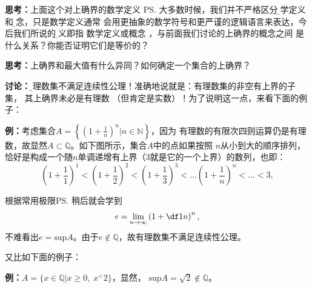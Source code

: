 	{\bf 思考：}上面这个对上确界的数学定义
	\ps{大多数时候，我们并不严格区分{\b 数学定义}和{\b 概念}，只是数学定义通常
	会用更抽象的数学符号和更严谨的逻辑语言来表达，今后我们所说的{\b 定义}即指
	数学定义或概念}
	，与前面我们讨论的上确界的概念之间	是什么关系？你能否证明它们是等价的？
	
	{\bf 思考：}上确界和最大值有什么异同？如何确定一个集合的上确界？
	
	{\bf 讨论：}{\b 有理数集不满足连续性公理！}准确地说就是：有理数集的非空有上界的子集，
	其上确界未必是有理数	（但肯定是实数）！为了说明这一点，来看下面的例子：
	
	{\bf 例：}考虑集合$A=\left\{\left(1+\frac 1n\right)^n|n\in\mathbb{N}\right\}$，因为
	有理数的有限次四则运算仍是有理数，故显然$A\subset\mathbb{Q}$。如下图所示，集合$A$中的点如果按照
	$n$从小到大的顺序排列，恰好是构成一个随$n$单调递增有上界（$3$就是它的一个上界）的数列，也即：
	$$\left(1+\frac11\right)^1<\left(1+\frac12\right)^2<\left(1+\frac13\right)^3<\ldots
	\left(1+\frac1n\right)^n<\ldots<3,$$
	\begin{center}
	\end{center}
	根据常用极限\ps{稍后就会学到}
	$$e=\lim\limits_{n\to\infty}\left(1+\df1n\right)^n,$$
	不难看出$e=\mathrm{sup}A$。由于$e\notin\mathbb{Q}$，故有理数集不满足连续性公理。
	
	又比如下面的例子：
	
	{\bf 例：}$A=\{x\in\mathbb{Q}|x\geq 0,\;x^<2\}$，显然，
	$\mathrm{sup}A=\sqrt2\notin\mathbb{Q}$。
	
